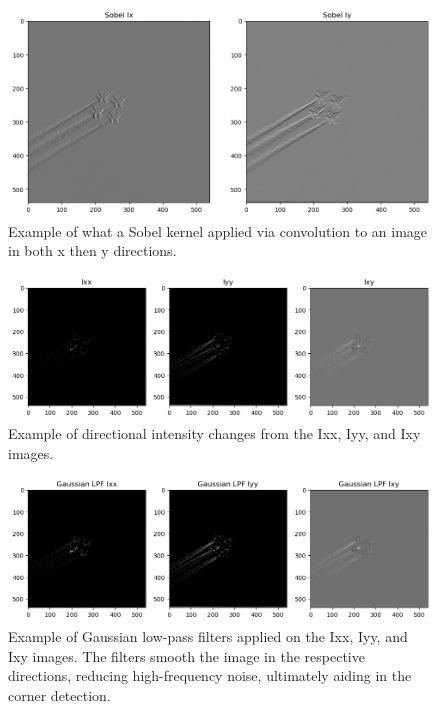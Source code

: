 \documentclass[11pt, conference, letterpaper]{IEEEtran}
\begin{document}
\onecolumn
\begin{figure}[t]
    \centering
    \includegraphics[width=0.6\linewidth]{images/gradients_sample.png}
    \caption{Example of what a Sobel kernel applied via convolution to an image in both x then y directions.}
    \label{fig:sobel_gradient}
\end{figure}

\begin{figure}[t]
    \centering
    \includegraphics[width=0.95\linewidth]{images/pre_gaussian_low_pass_filters.png}
    \caption{Example of directional intensity changes from the Ixx, Iyy, and Ixy images.}
    \label{fig:pre_gaussian_lpf}
\end{figure}

\begin{figure}[t]
    \centering
    \includegraphics[width=0.95\linewidth]{images/gaussian_low_pass_filters.png}
    \caption{Example of Gaussian low-pass filters applied on the Ixx, Iyy, and Ixy images. The filters smooth the image in the respective directions, reducing high-frequency noise, ultimately aiding in the corner detection.}
    \label{fig:gaussian_lpf}
\end{figure}
\end{document}

